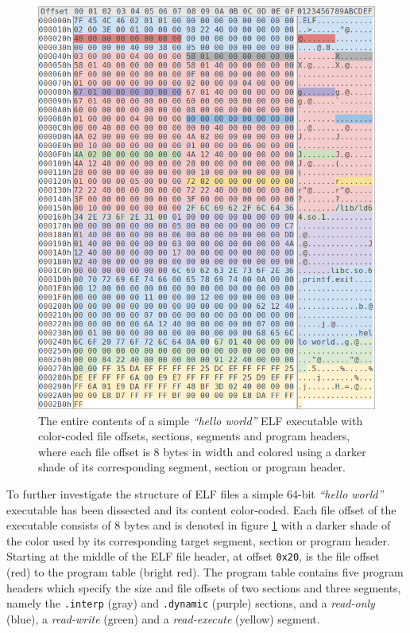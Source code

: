 \documentclass[12pt, a4paper]{article}
\begin{document}
\begin{figure}[htbp]
	\begin{center}
		\includegraphics[width=\textwidth]{inc/elf_dissection.png}
		\caption{The entire contents of a simple \textit{``hello world''} ELF executable with color-coded file offsets, sections, segments and program headers, where each file offset is 8 bytes in width and colored using a darker shade of its corresponding segment, section or program header.}
		\label{elf_dissection}
	\end{center}
\end{figure}

To further investigate the structure of ELF files a simple 64-bit \textit{``hello world''} executable has been dissected and its content color-coded. Each file offset of the executable consists of 8 bytes and is denoted in figure \ref{elf_dissection} with a darker shade of the color used by its corresponding target segment, section or program header. Starting at the middle of the ELF file header, at offset \texttt{0x20}, is the file offset (red) to the program table (bright red). The program table contains five program headers which specify the size and file offsets of two sections and three segments, namely the \texttt{.interp} (gray) and \texttt{.dynamic} (purple) sections, and a \textit{read-only} (blue), a \textit{read-write} (green) and a \textit{read-execute} (yellow) segment.
\end{document}

